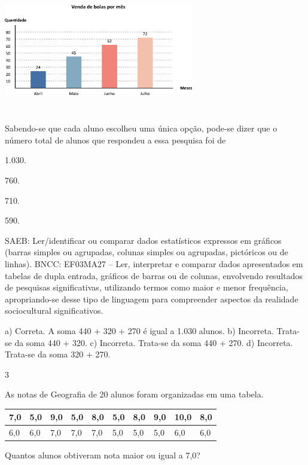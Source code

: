 \begin{multicols}{2}
\begin{enumerate}
{%

\includegraphics[width=3.25862in,height=2.14185in]{media/image105.png}

Sabendo-se que cada aluno escolheu uma única opção, pode-se dizer que o
número total de alunos que respondeu a essa pesquisa foi de

\begin{escolha}
\item
  1.030.
\item
  760.
\item
  710.
\item
  590.
\end{escolha}

SAEB: Ler/identificar ou comparar dados estatísticos expressos em gráficos (barras simples ou agrupadas, colunas simples ou agrupadas, pictóricos ou de linhas). 
BNCC: EF03MA27 -- Ler, interpretar e comparar dados apresentados em tabelas de dupla entrada,
gráficos de barras ou de colunas, envolvendo resultados de pesquisas significativas, utilizando
termos como maior e menor frequência, apropriando-se desse tipo de linguagem para
compreender aspectos da realidade sociocultural significativos.

a) Correta.  A soma 440 + 320 + 270 é igual a 1.030 alunos.
b) Incorreta. Trata-se da soma 440 + 320.
c) Incorreta. Trata-se da soma 440 + 270.
d) Incorreta. Trata-se da soma 320 + 270.

\num{3}

As notas de Geografia de 20 alunos foram organizadas em uma tabela.

\begin{longtable}[]{@{}llllllllll@{}}
\toprule
7,0 & 5,0 & 9,0 & 5,0 & 8,0 & 5,0 & 8,0 & 9,0 & 10,0 &
8,0\tabularnewline
\midrule
\endhead
6,0 & 6,0 & 7,0 & 7,0 & 7,0 & 5,0 & 5,0 & 5,0 & 6,0 & 6,0\tabularnewline
\bottomrule
\end{longtable}

Quantos alunos obtiveram nota maior ou igual a 7,0?

}
\end{enumerate}
\end{multicols}
